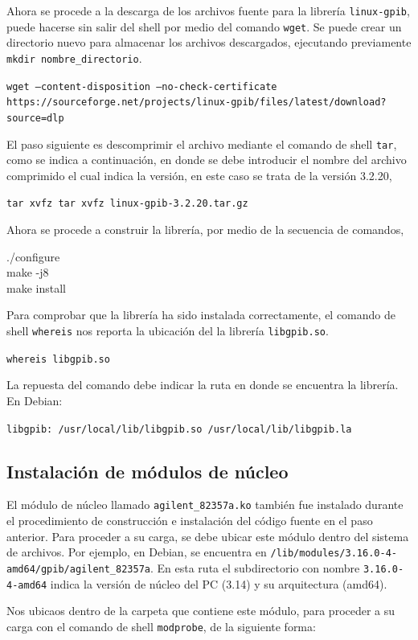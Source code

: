 \documentclass[paper=letter,oneside,fontsize=11pt, parskip=full]{scrartcl}
\newcommand{\code}[1]{{\ttfamily #1}}
\begin{document}
		Ahora se procede a la descarga de los archivos fuente para la librería \texttt{linux-gpib}, puede hacerse sin salir del shell por medio del comando \texttt{wget}. Se puede crear un directorio nuevo para almacenar los archivos descargados, ejecutando previamente \texttt{mkdir nombre\_directorio}.
		
		\texttt{wget --content-disposition --no-check-certificate https://sourceforge.net/projects/linux-gpib/files/latest/download?source=dlp}
		
		El paso siguiente es descomprimir el archivo mediante el comando de shell \texttt{tar}, como se indica a continuación, en donde se debe introducir el nombre del archivo comprimido el cual indica la versión, en este caso se trata de la versión 3.2.20,
		
		\texttt{tar xvfz tar xvfz linux-gpib-3.2.20.tar.gz}
		
		Ahora se procede a construir la librería, por medio de la secuencia de comandos,
		
		\code{		
			./configure \\		
			make -j8 	\\		
			make install
		}
		
		Para comprobar que la librería ha sido instalada correctamente, el comando de shell \texttt{whereis} nos reporta la ubicación del la librería \texttt{libgpib.so}.
		
		\texttt{whereis libgpib.so}
		
		La repuesta del comando debe indicar la ruta en donde se encuentra la librería. En Debian:
		
		\texttt{libgpib: /usr/local/lib/libgpib.so /usr/local/lib/libgpib.la}	
		
		\subsection{Instalación de módulos de núcleo}
		
		El módulo de núcleo llamado \texttt{agilent\_82357a.ko} también fue instalado durante el procedimiento de construcción e instalación del código fuente en el paso anterior. Para proceder a su carga, se debe ubicar este módulo dentro del sistema de archivos. Por ejemplo, en Debian, se encuentra en \texttt{/lib/modules/3.16.0-4-amd64/gpib/agilent\_82357a}. En esta ruta el subdirectorio con nombre \texttt{3.16.0-4-amd64} indica la versión de núcleo del PC (3.14) y su arquitectura (amd64). 
		
		Nos ubicaos dentro de la carpeta que contiene este módulo, para proceder a su carga con el comando de shell \texttt{modprobe}, de la siguiente forma:
		
\end{document}
